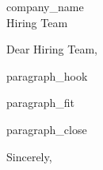 \documentclass[11pt]{letter}
\begin{document}
\begin{letter}{ {{ company_name }} \\ Hiring Team }

\opening{Dear Hiring Team,}

{{ paragraph_hook }}

{{ paragraph_fit }}

{{ paragraph_close }}

\closing{Sincerely,}

\end{letter}
\end{document}
